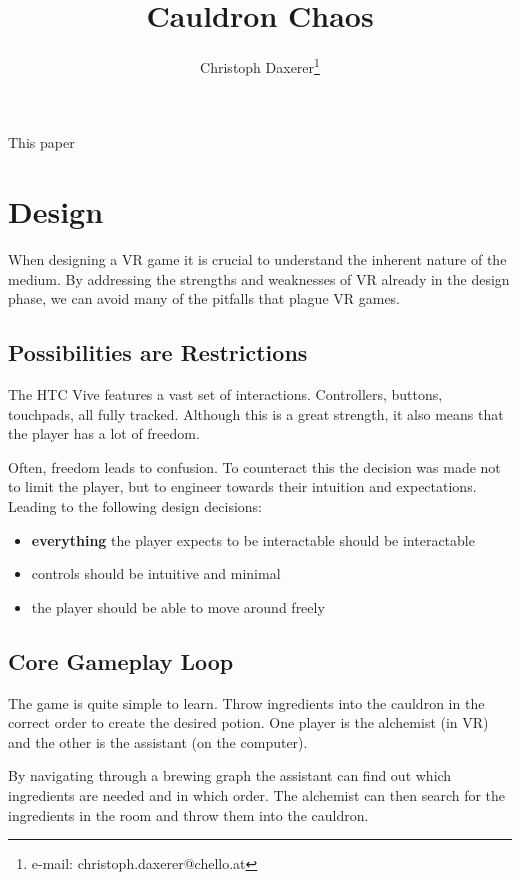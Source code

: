 \documentclass{vgtc}
\title{Cauldron Chaos}
\author{Christoph Daxerer\thanks{e-mail: christoph.daxerer@chello.at}}
\affiliation{\scriptsize Software Engineering ba. VZ FH-Oberösterreich Hagenberg}
\begin{document}

\maketitle

This paper 

\section{Design}

When designing a VR game it is crucial to understand the inherent nature of the medium. 
By addressing the strengths and weaknesses of VR already in the design phase, we can
avoid many of the pitfalls that plague VR games.

\subsection{Possibilities are Restrictions}

The HTC Vive features a vast set of interactions. Controllers, buttons, touchpads, all fully tracked. 
Although this is a great strength, it also means that the player has a lot of freedom. 

Often, freedom leads to confusion. To counteract this the decision was made not to limit the player,
but to engineer towards their intuition and expectations. Leading to the following design decisions:

\begin{itemize}
  \item \textbf{everything} the player expects to be interactable should be interactable
  \item controls should be intuitive and minimal
  \item the player should be able to move around freely
\end{itemize}

\subsection{Core Gameplay Loop}

The game is quite simple to learn. Throw ingredients into the cauldron in the correct order to create the 
desired potion. One player is the alchemist (in VR) and the other is the assistant (on the computer).

By navigating through a brewing graph the assistant can find out which ingredients are needed and 
in which order. The alchemist can then search for the ingredients in the room and throw them into the
cauldron.
\end{document}
